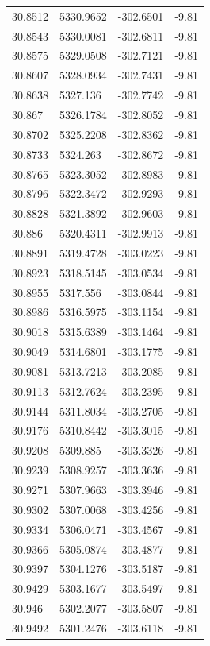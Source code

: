 \begin{table}[H]
\begin{tabular}{llll}
30.8512 & 5330.9652 & -302.6501 & -9.81 \\
30.8543 & 5330.0081 & -302.6811 & -9.81 \\
30.8575 & 5329.0508 & -302.7121 & -9.81 \\
30.8607 & 5328.0934 & -302.7431 & -9.81 \\
30.8638 & 5327.136 & -302.7742 & -9.81 \\
30.867 & 5326.1784 & -302.8052 & -9.81 \\
30.8702 & 5325.2208 & -302.8362 & -9.81 \\
30.8733 & 5324.263 & -302.8672 & -9.81 \\
30.8765 & 5323.3052 & -302.8983 & -9.81 \\
30.8796 & 5322.3472 & -302.9293 & -9.81 \\
30.8828 & 5321.3892 & -302.9603 & -9.81 \\
30.886 & 5320.4311 & -302.9913 & -9.81 \\
30.8891 & 5319.4728 & -303.0223 & -9.81 \\
30.8923 & 5318.5145 & -303.0534 & -9.81 \\
30.8955 & 5317.556 & -303.0844 & -9.81 \\
30.8986 & 5316.5975 & -303.1154 & -9.81 \\
30.9018 & 5315.6389 & -303.1464 & -9.81 \\
30.9049 & 5314.6801 & -303.1775 & -9.81 \\
30.9081 & 5313.7213 & -303.2085 & -9.81 \\
30.9113 & 5312.7624 & -303.2395 & -9.81 \\
30.9144 & 5311.8034 & -303.2705 & -9.81 \\
30.9176 & 5310.8442 & -303.3015 & -9.81 \\
30.9208 & 5309.885 & -303.3326 & -9.81 \\
30.9239 & 5308.9257 & -303.3636 & -9.81 \\
30.9271 & 5307.9663 & -303.3946 & -9.81 \\
30.9302 & 5307.0068 & -303.4256 & -9.81 \\
30.9334 & 5306.0471 & -303.4567 & -9.81 \\
30.9366 & 5305.0874 & -303.4877 & -9.81 \\
30.9397 & 5304.1276 & -303.5187 & -9.81 \\
30.9429 & 5303.1677 & -303.5497 & -9.81 \\
30.946 & 5302.2077 & -303.5807 & -9.81 \\
30.9492 & 5301.2476 & -303.6118 & -9.81 \\

\end{tabular}
\end{table}
